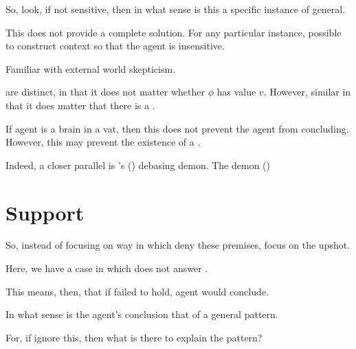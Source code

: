 \begin{note}
  So, look, if not sensitive, then in what sense is this a specific instance of general.
\end{note}

\newpage

\begin{note}
  This does not provide a complete solution.
  For any particular instance, possible to construct context so that the agent is insensitive.

  Familiar with external world skepticism.

   are distinct, in that it does not matter whether \(\phi\) has value \(v\).
  However, similar in that it does matter that there is a \pevent{}.

  If agent is a brain in a vat, then this does not prevent the agent from concluding.
  However, this may prevent the existence of a \pevent{}.

  Indeed, a closer parallel is \citeauthor{Schaffer:2010vq}'s (\citeyear{Schaffer:2010vq}) debasing demon.
  The demon  (\citeyear[231]{Schaffer:2010vq})
\end{note}

\section{Support}
\label{sec:support}

\begin{note}
  So, instead of focusing on way in which deny these premises, focus on the upshot.

  Here, we have a case in which does not answer \qWhyV{}.

  This means, then, that if \ros{} failed to hold, agent would conclude.

  In what sense is the agent's conclusion that of a general pattern.

  For, if ignore this, then what is there to explain the pattern?
\end{note}

